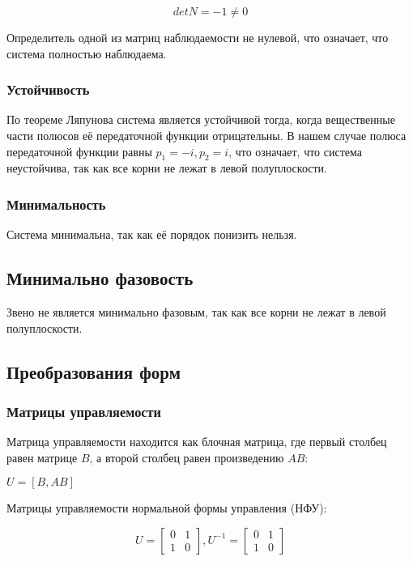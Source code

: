 \begin{equation*}
\text{$detN=-1\neq 0$}
\end{equation*}

Определитель одной из матриц наблюдаемости не нулевой, что означает, что система полностью наблюдаема.

\subsubsection{Устойчивость}

По теореме Ляпунова система является устойчивой тогда, когда вещественные части полюсов её передаточной функции отрицательны. В нашем случае полюса передаточной функции равны $p_1=-i, p_2=i$, что означает, что система неустойчива, так как все корни не лежат в левой полуплоскости. 

\subsubsection{Минимальность}

Система минимальна, так как её порядок понизить нельзя.

\subsection{Минимально фазовость}

Звено не является минимально фазовым, так как все корни не лежат в левой полуплоскости. 

\subsection{Преобразования форм}

\subsubsection{Матрицы управляемости}

Матрица управляемости находится как блочная матрица, где первый столбец равен матрице $B$, а второй столбец равен произведению $AB$:

\begin{center}
$U=[B, AB]$
\end{center}

Матрицы управляемости нормальной формы управления (НФУ):

\begin{equation*}
\text{$U= \begin{bmatrix}
0 & 1\\ 1 & 0
\end{bmatrix}$}
\text{$, U^{-1}=\begin{bmatrix} 0 & 1 \\ 1 & 0 \end{bmatrix}$}
\end{equation*}


